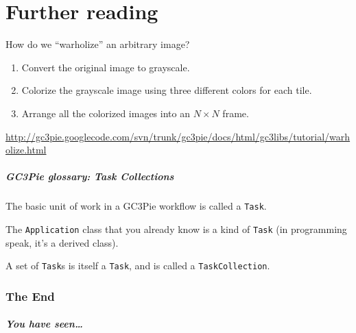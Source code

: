 \documentclass[english,serif,mathserif,usenames,dvipsnames]{beamer}
\begin{document}



\appendix
\part{Further reading}

\begin{frame}
How do we ``warholize'' an arbitrary image?

\+
\begin{enumerate}
\item Convert the original image to grayscale.
\item Colorize the grayscale image using three different colors for each tile.
\item Arrange all the colorized images into an $N\times N$ frame.
\end{enumerate}

\+
\begin{references}
  \url{http://gc3pie.googlecode.com/svn/trunk/gc3pie/docs/html/gc3libs/tutorial/warholize.html}
\end{references}
\end{frame}


\begin{frame}
  \frametitle{GC3Pie glossary: Task Collections}

  The basic unit of work in a GC3Pie workflow is called a \texttt{Task}.

  \+
  The \texttt{Application} class that you already know is a kind of
  \texttt{Task} (in programming speak, it's a derived class).

  \+
  A set of \texttt{Task}s is itself a \texttt{Task}, and is called a \texttt{TaskCollection}.
\end{frame}


\section{The End}
\begin{frame}[fragile]
  \frametitle{You have seen\ldots}
  \tableofcontents[sectionstyle=show/shaded]
\end{frame}
\end{document}
